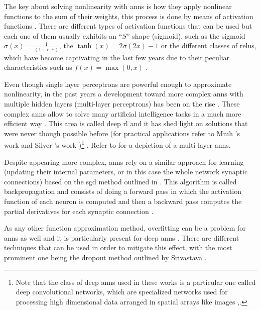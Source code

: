 \documentclass{seal_thesis}
\begin{document}
The key about solving nonlinearity with \glspl{ann} is how they apply nonlinear functions to the sum of their weights, this process is done by means of activation functions \cite[p. 216]{Sutton2017}. There are different types of activation functions that can be used but each one of them usually exhibits an ``$S$'' shape (\ie sigmoid), such as the sigmoid $\sigma(x) = \frac{1}{(1+e^{-x})}$, the $\tanh(x) = 2\sigma(2x)-1$ or the different classes of \glspl{relu}, which have become captivating in the last few years due to their peculiar characteristics such as $f(x) = \max(0,x)$ \cite[p. 216]{Sutton2017}.


Even though single layer perceptrons are powerful enough to approximate nonlinearity, in the past years a development toward more complex \glspl{ann} with multiple hidden layers (\ie multi-layer perceptrons) has been on the rise \cite[p. 217]{Sutton2017}. These complex \glspl{ann} allow to solve many artificial intelligence tasks in a much more efficient way \cite{Bengio2009}. This area is called deep \gls{rl} and it has shed light on solutions that were never though possible before (for practical applications refer to Mnih \etal's work \cite{Mnih2015} and Silver \etal's work \cite{Silver2016})\footnote{Note that the class of deep \glspl{ann} used in these works is a particular one called deep convolutional networks, which are specialized networks used for processing high dimensional data arranged in spatial arrays like images \cite[p. 219]{Sutton2017},\cite{Lecun1998}.} \cite{Bengio2009}. Refer to  for a depiction of a multi layer \glspl{ann}.


Despite appearing more complex, \glspl{ann} rely on a similar approach for learning (\ie updating their internal parameters, or in this case the whole network synaptic connections) based on the \gls{sgd} method outlined in  \cite[p. 217]{Sutton2017}. This algorithm is called backpropagation and consists of doing a forward pass in which the activation function of each neuron is computed and then a backward pass computes the partial derivatives for each synaptic connection \cite[p. 218]{Sutton2017}.

As any other function approximation method, overfitting can be a problem for \glspl{ann} as well and it is particularly present for deep \glspl{ann} \cite[p. 218]{Sutton2017}. There are different techniques that can be used in order to mitigate this effect, with the most prominent one being the dropout method outlined by Srivastava \etal \cite{Srivastava2014}.
\end{document}
